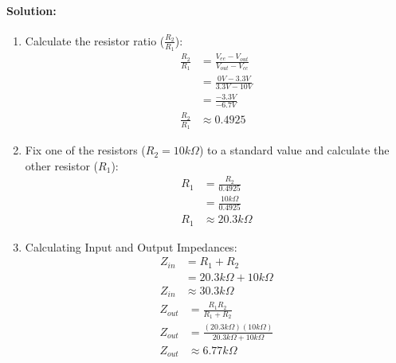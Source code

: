 \paragraph{Solution:}
\begin{enumerate}
  \item Calculate the resistor ratio (\(\frac{R_2}{R_1}\)):
    \begin{align*}
      \frac{R_2}{R_1} &= \frac{V_{ee} - V_{out}}{V_{out} - V_{cc}} \\
      &= \frac{0V - 3.3V}{3.3V - 10V} \\
      &= \frac{-3.3V}{-6.7V} \\
    \frac{R_2}{R_1} &\approx 0.4925
    \end{align*}
  \item Fix one of the resistors (\(R_2 = 10 k\Omega\)) to a standard
    value and calculate the other resistor (\(R_1\)):
    \begin{align*}
      R_1 &= \frac{R_2}{0.4925} \\
      &= \frac{10 k\Omega}{0.4925} \\
      R_1 &\approx 20.3 k\Omega
    \end{align*}
  \item Calculating Input and Output Impedances:
    \[
        \begin{aligned}
        Z_{in} &= R_1 + R_2 \\
        &= 20.3 k\Omega + 10 k\Omega \\
        Z_{in} &\approx 30.3 k\Omega
        \end{aligned}
      \]
      \[
        \begin{aligned}
          Z_{out} &= \frac{R_1 R_2}{R_1 + R_2} \\
          Z_{out} &= \frac{(20.3 k\Omega)(10 k\Omega)}{20.3 k\Omega + 10 k\Omega} \\
          Z_{out} &\approx 6.77 k\Omega
        \end{aligned}
      \]
\end{enumerate}

